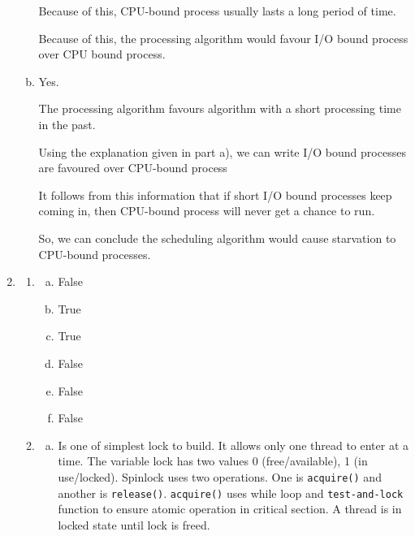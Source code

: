 \documentclass[12pt]{article}
\begin{document}
\begin{enumerate}[1.]
\begin{enumerate}[a)]
        \bigskip

        Because of this, CPU-bound process usually lasts a long period of time.

        \bigskip

        Because of this, the processing algorithm would favour I/O bound process
        over CPU bound process.

        \item

        Yes.

        \bigskip

        The processing algorithm favours algorithm with a short processing time in the past.

        \bigskip

        Using the explanation given in part a), we can write I/O bound processes are favoured
        over CPU-bound process

        \bigskip

        It follows from this information that if short I/O bound processes keep coming in,
        then CPU-bound process will never get a chance to run.

        \bigskip

        So, we can conclude the scheduling algorithm would cause starvation to CPU-bound processes.

    \end{enumerate}

    \item

    \begin{enumerate}[1)]
        \item

        \begin{enumerate}[a)]
            \item False
            \item True
            \item True
            \item False
            \item False
            \item False
        \end{enumerate}

        \item

        \begin{enumerate}[a)]
            \item Is one of simplest lock to build. It allows only one thread to enter at a time. The variable lock
            has two values 0 (free/available), 1 (in use/locked). Spinlock uses two operations. One is \texttt{acquire()}
            and another is \texttt{release()}. \texttt{acquire()} uses while loop and \texttt{test-and-lock} function to
            ensure atomic operation in critical section. A thread is in locked state until lock is freed.


\end{enumerate}
\end{enumerate}
\end{enumerate}
\end{document}
